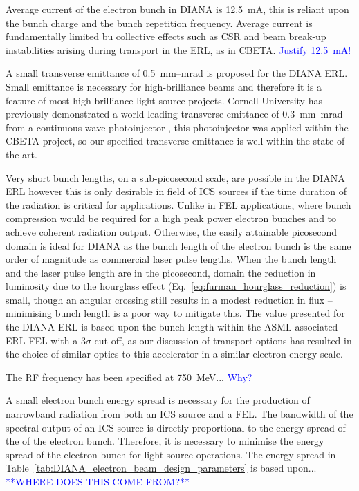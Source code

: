 \documentclass[../main.tex]{subfiles}
\begin{document}
Average current of the electron bunch in DIANA is 12.5~\si{\milli\ampere}, this is reliant upon the bunch charge and the bunch repetition frequency. Average current is fundamentally limited bu collective effects such as CSR and beam break-up instabilities arising during transport in the ERL, as in CBETA. \textcolor{blue}{Justify 12.5~\si{\milli\ampere}!}

A small transverse emittance of 0.5~\si{\milli\meter}--\si{\milli\radian} is proposed for the DIANA ERL. Small emittance is necessary for high-brilliance beams and therefore it is a feature of most high brilliance light source projects. Cornell University has previously demonstrated a world-leading transverse emittance of 0.3~\si{\milli\meter}--\si{\milli\radian} from a continuous wave photoinjector \cite{bartnik2015operational}, this photoinjector was applied within the CBETA project, so our specified transverse emittance is well within the state-of-the-art.

Very short bunch lengths, on a sub-picosecond scale, are possible in the DIANA ERL however this is only desirable in field of ICS sources if the time duration of the radiation is critical for applications. Unlike in FEL applications, where bunch compression would be required for a high peak power electron bunches and to achieve coherent radiation output. Otherwise, the easily attainable picosecond domain is ideal for DIANA as the bunch length of the electron bunch is the same order of magnitude as commercial laser pulse lengths. When the bunch length and the laser pulse length are in the picosecond, domain the reduction in luminosity due to the hourglass effect (Eq.~\ref{eq:furman_hourglass_reduction}) is small, though an angular crossing still results in a modest reduction in flux -- minimising bunch length is a poor way to mitigate this. The value presented for the DIANA ERL is based upon the bunch length within the ASML associated ERL-FEL \cite{akkermans2017compact} with a 3$\sigma$ cut-off, as our discussion of transport options has resulted in the choice of similar optics to this accelerator in a similar electron energy scale.   

The RF frequency has been specified at 750~\si{\mega\electronvolt}... \textcolor{blue}{Why?}

A small electron bunch energy spread is necessary for the production of narrowband radiation from both an ICS source and a FEL. The bandwidth of the spectral output of an ICS source is directly proportional to the energy spread of the of the electron bunch. Therefore, it is necessary to minimise the energy spread of the electron bunch for light source operations. The energy spread in Table~\ref{tab:DIANA_electron_beam_design_parameters} is based upon... \textcolor{blue}{**WHERE DOES THIS COME FROM?**}
\end{document}
